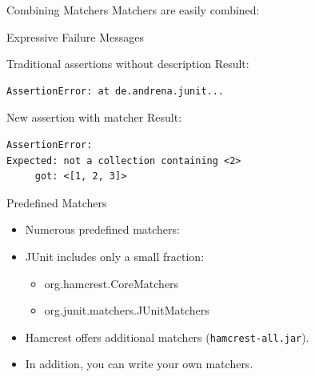 \begin{frame}[fragile]{Combining Matchers}
	Matchers are easily combined:
\end{frame}

\begin{frame}[fragile]{Expressive Failure Messages}
    \begin{block}{Traditional assertions without description}
Result:
\begin{lstlisting}
AssertionError: at de.andrena.junit...
\end{lstlisting}
    \end{block}	
\pause
    \begin{block}{New assertion with matcher}
Result:
\begin{lstlisting}
AssertionError:
Expected: not a collection containing <2>
     got: <[1, 2, 3]>
\end{lstlisting}
    \end{block}
\end{frame}

\begin{frame}{Predefined Matchers}
    \begin{itemize}
        \item Numerous predefined matchers:
        \item JUnit includes only a small fraction:
        \begin{itemize}
            \item org.hamcrest.CoreMatchers
            \item org.junit.matchers.JUnitMatchers
        \end{itemize}
        \item Hamcrest offers additional matchers (\texttt{hamcrest-all.jar}).
        \item<alert@2> In addition, you can write your own matchers.
    \end{itemize}
\end{frame}

